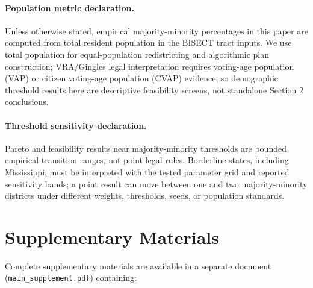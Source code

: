 \documentclass[12pt,letterpaper]{article}
\begin{document}
\paragraph{Population metric declaration.} Unless otherwise stated, empirical majority-minority percentages in this paper are computed from total resident population in the BISECT tract inputs. We use total population for equal-population redistricting and algorithmic plan construction; VRA/Gingles legal interpretation requires voting-age population (VAP) or citizen voting-age population (CVAP) evidence, so demographic threshold results here are descriptive feasibility screens, not standalone Section 2 conclusions.

\paragraph{Threshold sensitivity declaration.} Pareto and feasibility results near majority-minority thresholds are bounded empirical transition ranges, not point legal rules. Borderline states, including Mississippi, must be interpreted with the tested parameter grid and reported sensitivity bands; a point result can move between one and two majority-minority districts under different weights, thresholds, seeds, or population standards.

\doublespacing










\clearpage


\singlespacing


\appendix
\section*{Supplementary Materials}

Complete supplementary materials are available in a separate document (\texttt{main\_supplement.pdf}) containing:
\end{document}
